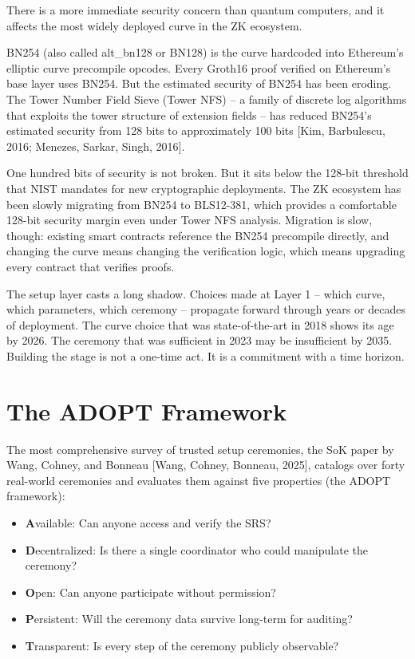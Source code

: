 \documentclass[
  11pt,
  openany]{report}
\providecommand{\tightlist}{%
  \setlength{\itemsep}{0pt}\setlength{\parskip}{0pt}}
\renewcommand{\textbf}[1]{{\bfseries\color{MidnightBold}#1}}
\begin{document}
There is a more immediate security concern than quantum computers, and it
affects the most widely deployed curve in the ZK ecosystem.

BN254 (also called alt\_bn128 or BN128) is the curve hardcoded into Ethereum's
elliptic curve precompile opcodes. Every Groth16 proof verified on Ethereum's
base layer uses BN254. But the estimated security of BN254 has been eroding. The
Tower Number Field Sieve (Tower NFS) -- a family of discrete log algorithms that
exploits the tower structure of extension fields -- has reduced BN254's
estimated security from 128 bits to approximately 100 bits {[}Kim, Barbulescu,
2016; Menezes, Sarkar, Singh, 2016{]}.

One hundred bits of security is not broken. But it sits below the 128-bit
threshold that NIST mandates for new cryptographic deployments. The ZK ecosystem
has been slowly migrating from BN254 to BLS12-381, which provides a comfortable
128-bit security margin even under Tower NFS analysis. Migration is slow,
though: existing smart contracts reference the BN254 precompile directly, and
changing the curve means changing the verification logic, which means upgrading
every contract that verifies proofs.

The setup layer casts a long shadow. Choices made at Layer 1 -- which curve,
which parameters, which ceremony -- propagate forward through years or decades
of deployment. The curve choice that was state-of-the-art in 2018 shows its age
by 2026. The ceremony that was sufficient in 2023 may be insufficient by 2035.
Building the stage is not a one-time act. It is a commitment with a time
horizon.

\section{The ADOPT Framework}\label{the-adopt-framework}

The most comprehensive survey of trusted setup ceremonies, the SoK paper by
Wang, Cohney, and Bonneau {[}Wang, Cohney, Bonneau, 2025{]}, catalogs over forty
real-world ceremonies and evaluates them against five properties (the ADOPT
framework):

\begin{itemize}
\tightlist
\item
  \textbf{A}vailable: Can anyone access and verify the SRS?
\item
  \textbf{D}ecentralized: Is there a single coordinator who could manipulate the
  ceremony?
\item
  \textbf{O}pen: Can anyone participate without permission?
\item
  \textbf{P}ersistent: Will the ceremony data survive long-term for auditing?
\item
  \textbf{T}ransparent: Is every step of the ceremony publicly observable?
\end{itemize}
\end{document}
